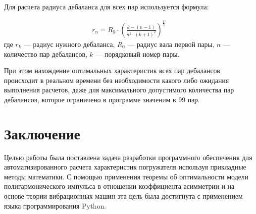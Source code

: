 Для расчета радиуса дебаланса для всех пар используется формула:

\begin{equation}\label{eq:ring_rad}
    \begin{gathered}
        r_n = R_0 \cdot \left( \frac{k - (n - 1)}{n^2 \cdot (k + 1)^2} \right)^\frac{1}{3}
    \end{gathered}
\end{equation}
\noindent где $r_k$ --- радиус нужного дебаланса, $R_0$ --- радиус вала первой пары, $n$ --- количество пар дебалансов, $k$ --- порядковый номер пары.

При этом нахождение оптимальных характеристик всех пар дебалансов происходит в реальном времени без необходимости какого либо ожидания выполнения расчетов,
даже для максимального допустимого количества пар дебалансов, которое ограничено в программе значеним в 99 пар.

\clearpage
\section{Заключение}

Целью работы была поставлена задача разработки программного обеспечения
для автоматизированного расчета характеристик погружателя используя прикладные методы математики.
С помощью применения теоремы об оптимальности модели полигармонического импульса в отношении коэффициента асимметрии и на основе теории вибрационных машин
эта цель была достигнута с применением языка программирования Python.


\clearpage
{}
\nocite{*}
\printbibliography{}
